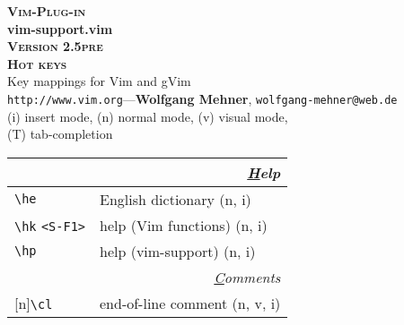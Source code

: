 \documentclass[oneside,10pt,landscape,DIV16]{scrartcl}
\newcommand{\Pluginversion}{2.5pre}
\newcommand{\Rep}{{\scriptsize{[n]}}}
\begin{document}
%

\begin{multicols}{3}
%
\begin{center}
%
\textbf{\textsc{\small{Vim-Plug-in}}}\\
\textbf{\LARGE{vim-support.vim}}\\
\textbf{\textsc{\small{Version \Pluginversion}}}\\
\vspace{1mm}%
\textbf{\textsc{\Huge{Hot keys}}}\\ 
\vspace{1mm}%
Key mappings for Vim and gVim\\
{\tiny  \texttt{http://www.vim.org}\hspace{1.5mm}---\hspace{1.5mm}\textbf{Wolfgang Mehner},  \texttt{wolfgang-mehner@web.de}}\\
\vspace{1.0mm}
{\normalsize (i)} insert mode, {\normalsize (n)} normal mode, {\normalsize (v)} visual mode,\\
{\normalsize (T)} tab-completion
\vspace{1.0mm}
%
\begin{tabular}[]{|p{11mm}|p{58mm}|}
\hline 
\multicolumn{2}{|r|}{\textsl{\underline{H}elp}}\\[1.0ex]
\hline \verb'\he'                 & English dictionary   \hfill (n, i)\\
\hline \verb'\hk' \verb'<S-F1>'   & help (Vim functions) \hfill (n, i)\\
\hline \verb'\hp'                 & help (vim-support)   \hfill (n, i)\\
\hline 
\hline
\multicolumn{2}{|r|}{\textsl{\underline{C}omments}}                       \\[1.0ex]
\hline \Rep\verb'\cl'   & end-of-line comment               \hfill (n, v, i)\\

\end{tabular}
\end{center}
\end{multicols}
\end{document}
